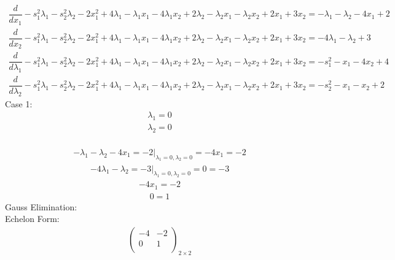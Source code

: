 \documentclass{article}
\begin{document}
\begin{align*}
\dfrac{d}{dx_{1}}-s_{1}^{2}\lambda_{1} - s_{2}^{2}\lambda_{2} - 2x_{1}^{2} + 4\lambda_{1} - \lambda_{1}x_{1} - 4\lambda_{1}x_{2} + 2\lambda_{2} - \lambda_{2}x_{1} - \lambda_{2}x_{2} + 2x_{1} + 3x_{2}=-\lambda_{1} - \lambda_{2} - 4x_{1} + 2\end{align*}
\begin{align*}
\dfrac{d}{dx_{2}}-s_{1}^{2}\lambda_{1} - s_{2}^{2}\lambda_{2} - 2x_{1}^{2} + 4\lambda_{1} - \lambda_{1}x_{1} - 4\lambda_{1}x_{2} + 2\lambda_{2} - \lambda_{2}x_{1} - \lambda_{2}x_{2} + 2x_{1} + 3x_{2}=-4\lambda_{1} - \lambda_{2} + 3\end{align*}
\begin{align*}
\dfrac{d}{d\lambda_{1}}-s_{1}^{2}\lambda_{1} - s_{2}^{2}\lambda_{2} - 2x_{1}^{2} + 4\lambda_{1} - \lambda_{1}x_{1} - 4\lambda_{1}x_{2} + 2\lambda_{2} - \lambda_{2}x_{1} - \lambda_{2}x_{2} + 2x_{1} + 3x_{2}=-s_{1}^{2} - x_{1} - 4x_{2} + 4\end{align*}
\begin{align*}
\dfrac{d}{d\lambda_{2}}-s_{1}^{2}\lambda_{1} - s_{2}^{2}\lambda_{2} - 2x_{1}^{2} + 4\lambda_{1} - \lambda_{1}x_{1} - 4\lambda_{1}x_{2} + 2\lambda_{2} - \lambda_{2}x_{1} - \lambda_{2}x_{2} + 2x_{1} + 3x_{2}=-s_{2}^{2} - x_{1} - x_{2} + 2\end{align*}
Case 1: \begin{align*}
\lambda_{1}=0\end{align*}
 \begin{align*}
\lambda_{2}=0\end{align*}
 \\
\begin{align*}
\left.-\lambda_{1} - \lambda_{2} - 4x_{1}=-2\right|_{\lambda_{1}=0,\lambda_{2}=0}=-4x_{1}=-2\end{align*}
\begin{align*}
\left.-4\lambda_{1} - \lambda_{2}=-3\right|_{\lambda_{1}=0,\lambda_{2}=0}=0=-3\end{align*}
\begin{align*}
-4x_{1}=-2\end{align*}
\begin{align*}
0=1\end{align*}
Gauss Elimination:\\
Echelon Form:\\
\begin{align*}
\left(
\begin{array}{c|c}
-4 & -2\\
0 & 1\\
\end{array}
\right)_{2\times 2}
\end{align*}
\end{document}
